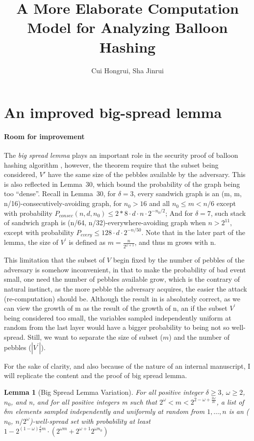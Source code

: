 \documentclass[a4paper, oneside]{article}
\author{Cui Hongrui, Sha Jinrui}
\title{A More Elaborate Computation Model for Analyzing Balloon Hashing}
\newtheorem{lemma}{Lemma}
\begin{document}
\maketitle{}

\section{An improved big-spread lemma}
\paragraph{Room for improvement}
The \textit{big spread lemma} plays an important role in the security proof of balloon hashing algorithm \cite{corrigan2016balloon},
however, the theorem require that the subset being considered, $V\prime$ have the same size of the pebbles available by the adversary.
This is also reflected in Lemma~30, which bound the probability of the graph being too ``dense''. Recall in Lemma~30, for $\delta=3$,
every sandwich graph is an (m, m, n/16)-consecutively-avoiding graph, for $n_0 > 16$ and all $n_0 \leq m < n/6$ except with
probability $P_{consec}(n, d, n_0) \leq 2*8 \cdot d \cdot n \cdot 2^{-n_0/2}$; And for $\delta=7$, such stack of sandwich graph is
(n/64, n/32)-everywhere-avoiding graph when $n > 2^{11}$, except with probability $P_{every} \leq 128\cdot d\cdot 2^{-n/50}$.
Note that in the later part of the lemma, the size of $V^\prime$ is defined as $m=\frac{n}{2^{\omega+1}}$, and thus m grows with
n.

This limitation that the subset of $V$ begin fixed by the number of pebbles of the adversary is somehow inconvenient, in that to make
the probability of bad event small, one need the number of pebbles available grow, which is the contrary of natural instinct, as
the more pebble the adversary acquires, the easier the attack (re-computation) should be. Although the result in \cite{corrigan2016balloon}
is absolutely correct, as we can view the growth of m as the result of the growth of n, an if the subset $V^\prime$ being considered too
small, the variables sampled independently uniform at random from the last layer would have a bigger probability to being not so well-spread.
Still, we want to separate the size of subset ($m$) and the number of pebbles ($|V^\prime|$).

For the sake of clarity, and also because of the nature of an internal manuscript, I will replicate the content and the proof of
big spread lemma.

\begin{lemma}[Big Spread Lemma Variation]\label{lemma::bigspreadvar}
  For all positive integer $\delta \geq 3$, $\omega \geq 2$, $n_0$, and n, and for all positive integers m such that
  $2^\omega < m < 2^{2-\omega+\frac{2\omega}{\delta e}}$, a list of $\delta m$ elements sampled independently and uniformly at random from
  ${1,\ldots,n}$ is an ($n_0$, $n/2^\omega$)-well-spread set with probability at least
  $1-2^{(1-\omega)\frac{\delta}{2}m} \cdot (2^{\omega m}+2^{\omega+1}2^{\omega n_0})$
\end{lemma}
\end{document}
